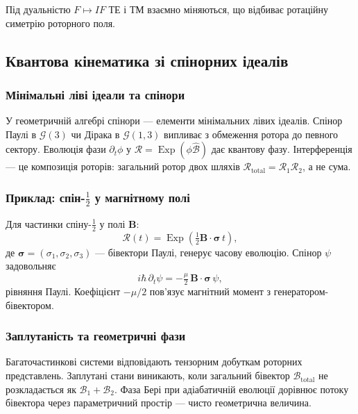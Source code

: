\documentclass[11pt,a4paper]{article}
\newcommand{\Exp}{\operatorname{Exp}}
\newcommand{\Rotor}{\mathcal{R}}
\newcommand{\Biv}{\mathcal{B}}
\theoremstyle{definition}
\theoremstyle{plain}
\theoremstyle{remark}
\begin{document}
Під дуальністю $F \mapsto IF$ ТЕ і ТМ взаємно міняються, що відбиває ротаційну симетрію роторного поля.

\subsection{Квантова кінематика зі спінорних ідеалів}

\subsubsection{Мінімальні ліві ідеали та спінори}

У геометричній алгебрі спінори — елементи мінімальних лівих ідеалів. Спінор Паулі в $\mathcal{G}(3)$ чи Дірака в $\mathcal{G}(1,3)$ випливає з обмеження ротора до певного сектору. Еволюція фази $\partial_t \phi$ у $\Rotor = \Exp(\phi\hat{\Biv})$ дає квантову фазу. Інтерференція — це композиція роторів: загальний ротор двох шляхів $\Rotor_{\text{total}} = \Rotor_1 \Rotor_2$, а не сума.

\subsubsection{Приклад: спін-$\tfrac{1}{2}$ у магнітному полі}

Для частинки спіну-$\tfrac{1}{2}$ у полі $\mathbf{B}$:
\begin{equation}
\Rotor(t) = \Exp\!\left(\tfrac{1}{2}\mathbf{B}\cdot\bm{\sigma}\, t\right),
\end{equation}
де $\bm{\sigma} = (\sigma_1, \sigma_2, \sigma_3)$ — бівектори Паулі, генерує часову еволюцію. Спінор $\psi$ задовольняє
\begin{equation}
i\hbar\, \partial_t \psi = -\tfrac{\mu}{2}\, \mathbf{B}\cdot\bm{\sigma}\, \psi,
\end{equation}
рівняння Паулі. Коефіцієнт $-\mu/2$ пов’язує магнітний момент з генератором-бівектором.

\subsubsection{Заплутаність та геометричні фази}

Багаточастинкові системи відповідають тензорним добуткам роторних представлень. Заплутані стани виникають, коли загальний бівектор $\Biv_{\text{total}}$ не розкладається як $\Biv_1 + \Biv_2$. Фаза Бері при адіабатичній еволюції дорівнює потоку бівектора через параметричний простір — чисто геометрична величина.
\end{document}
